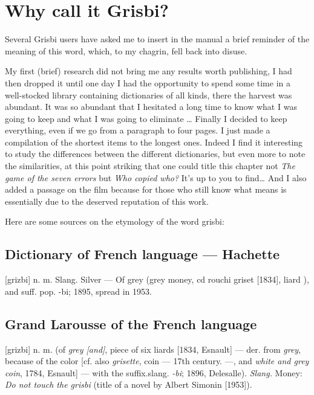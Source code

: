 \section*{Why call it Grisbi?}

Several \gls{Grisbi} users have asked me to insert in the manual a brief
reminder of the meaning of this word, which, to my chagrin, fell back into disuse.


My first (brief) research did not bring me any results worth publishing, I had then dropped it until one day I had the opportunity to spend some time in a well-stocked library containing dictionaries of all kinds, there the harvest was abundant. It was so abundant that I hesitated a long time to know what I was going to keep and what I was going to eliminate \ldots
Finally I decided to keep everything, even if we go from a paragraph to four pages. I just made a compilation of the shortest items to the longest ones.
Indeed I find it interesting to study the differences between the different
dictionaries, but even more to note the similarities, at this point
striking that one could title this chapter not \emph{The game of the seven
errors} but \emph{Who copied who?} It's up to you to find\dots
And I also added a passage on the film because for those who still know
what  means is essentially due to the deserved reputation of this work.

Here are some sources on the etymology  of the word grisbi:

\subsection*{Dictionary of French language --- Hachette}

[grizbi] n. m. Slang. Silver --- Of grey (grey money, cd rouchi griset [1834], \og liard \fg{}), and suff. pop. -bi; 1895, spread in 1953.

\subsection*{Grand Larousse of the French language}

[grizbi] n. m. (of \emph{grey [and]}, piece of six liards [1834, Esnault] --- der.
from \emph{grey}, because of the color [cf. also \emph{grisette}, \og coin \fg{} --- 17th century. ---, and \emph{white and grey coin}, 1784, Esnault] --- with the suffix.slang. \emph{-bi}; 1896, Delesalle).
\emph{Slang.} Money: \emph{Do not touch the grisbi} (title of a novel by Albert
Simonin [1953]).


